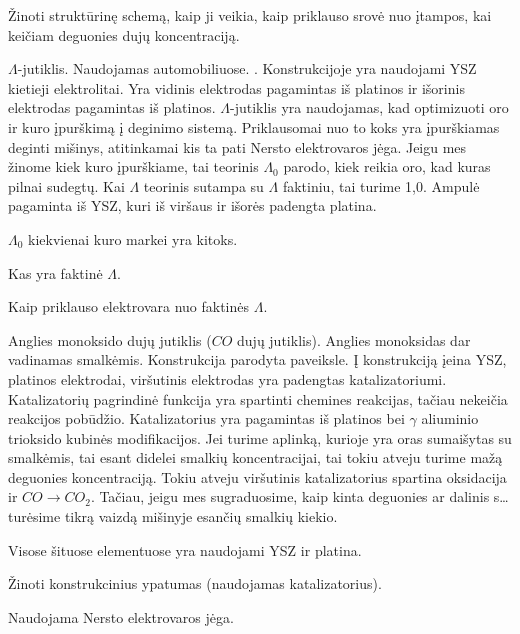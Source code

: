 \begin{remember}
  \item Žinoti struktūrinę  schemą, kaip ji veikia, kaip
    priklauso srovė nuo įtampos, kai keičiam deguonies dujų
    koncentraciją.
\end{remember}

$\Lambda$-jutiklis. Naudojamas automobiliuose. .
Konstrukcijoje yra naudojami YSZ kietieji elektrolitai. Yra vidinis
elektrodas pagamintas iš platinos ir išorinis elektrodas pagamintas iš
platinos. $\Lambda$-jutiklis yra naudojamas, kad optimizuoti oro ir
kuro įpurškimą į deginimo sistemą. Priklausomai nuo to koks yra
įpurškiamas deginti mišinys, atitinkamai kis ta pati Nersto elektrovaros
jėga. Jeigu mes žinome kiek kuro įpurškiame, tai teorinis $\Lambda_{0}$
parodo, kiek reikia oro, kad kuras pilnai sudegtų. Kai $\Lambda$
teorinis sutampa su $\Lambda$ faktiniu, tai turime 1,0. Ampulė
pagaminta iš YSZ, kuri iš viršaus ir išorės padengta platina.

\begin{remember}
  \item $\Lambda_{0}$ kiekvienai kuro markei yra kitoks.
  \item Kas yra faktinė $\Lambda$.
  \item Kaip priklauso elektrovara nuo faktinės $\Lambda$.
\end{remember}

Anglies monoksido dujų jutiklis ($CO$ dujų jutiklis). Anglies
monoksidas dar vadinamas smalkėmis. Konstrukcija parodyta 
paveiksle. Į konstrukciją įeina YSZ, platinos elektrodai, viršutinis
elektrodas yra padengtas katalizatoriumi. Katalizatorių pagrindinė
funkcija yra spartinti chemines reakcijas, tačiau nekeičia reakcijos
pobūdžio. Katalizatorius yra pagamintas iš platinos bei $\gamma$ aliuminio
trioksido kubinės modifikacijos. Jei turime aplinką, kurioje yra oras
sumaišytas su smalkėmis, tai esant didelei smalkių koncentracijai,
tai tokiu atveju turime mažą deguonies koncentraciją. Tokiu atveju
viršutinis katalizatorius spartina oksidacija ir $CO \to CO_{2}$.
Tačiau, jeigu mes sugraduosime, kaip kinta deguonies ar dalinis
s… turėsime tikrą vaizdą mišinyje esančių smalkių kiekio.

Visose šituose elementuose yra naudojami YSZ ir platina.

\begin{remember}
  \item Žinoti konstrukcinius ypatumas (naudojamas katalizatorius).
  \item Naudojama Nersto elektrovaros jėga.
\end{remember}

